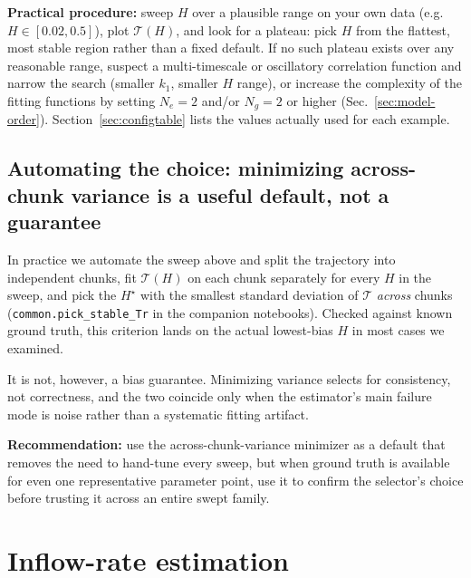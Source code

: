 \documentclass[11pt]{article}
\newcommand{\traffic}{\mathcal{T}}
\begin{document}
\noindent\textbf{Practical procedure:} sweep $H$ over a plausible range on your own data (e.g.~$H\in[0.02,0.5]$), plot $\traffic(H)$, and look for a plateau: pick $H$ from the flattest, most stable region rather than a fixed default. If no such plateau exists over any reasonable range, suspect a multi-timescale or oscillatory correlation function and narrow the search (smaller $k_1$, smaller $H$ range), or increase the complexity of the fitting functions by setting $N_e=2$ and/or $N_g=2$ or higher (Sec.~\ref{sec:model-order}). Section~\ref{sec:configtable} lists the values actually used for each example.

\subsection{Automating the choice: minimizing across-chunk variance is a useful default, not a guarantee}
\label{sec:H-autoselect}

In practice we automate the sweep above and split the trajectory into independent chunks, fit $\traffic(H)$ on each chunk separately for every $H$ in the sweep, and pick the $H^\star$ with the smallest standard deviation of $\traffic$ \emph{across} chunks (\texttt{common.pick\_stable\_Tr} in the companion notebooks). Checked against known ground truth, this criterion lands on the actual lowest-bias $H$ in most cases we examined.

It is not, however, a bias guarantee. Minimizing variance selects for consistency, not correctness, and the two coincide only when the estimator's main failure mode is noise rather than a systematic fitting artifact. 

\textbf{Recommendation:} use the across-chunk-variance minimizer as a default that removes the need to hand-tune every sweep, but when ground truth is available for even one representative parameter point, use it to confirm the selector's choice before trusting it across an entire swept family.

\section{Inflow-rate estimation}
\label{sec:inflow}
\end{document}
